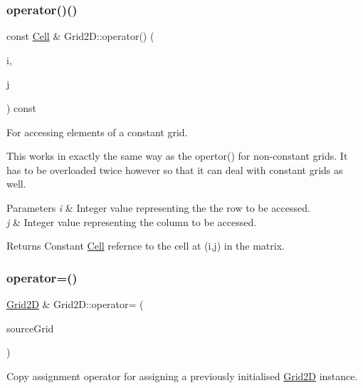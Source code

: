 \subsubsection{\texorpdfstring{operator()()}{operator()()}\hspace{0.1cm}{\footnotesize\ttfamily [2/2]}}
{\footnotesize\ttfamily const \hyperlink{class_cell}{Cell} \& Grid2\+D\+::operator() (\begin{DoxyParamCaption}\item[{int}]{i,  }\item[{int}]{j }\end{DoxyParamCaption}) const}



For accessing elements of a constant grid. 

This works in exactly the same way as the opertor() for non-\/constant grids. It has to be overloaded twice however so that it can deal with constant grids as well.


\begin{DoxyParams}{Parameters}
{\em i} & Integer value representing the the row to be accessed.\\
\hline
{\em j} & Integer value representing the column to be accessed.\\
\hline
\end{DoxyParams}
\begin{DoxyReturn}{Returns}
Constant \hyperlink{class_cell}{Cell} refernce to the cell at (i,j) in the matrix. 
\end{DoxyReturn}
\mbox{\label{class_grid2_d_adff3f6e81d650b093fa6c130c7619a07}} 
\subsubsection{\texorpdfstring{operator=()}{operator=()}\hspace{0.1cm}{\footnotesize\ttfamily [1/2]}}
{\footnotesize\ttfamily \hyperlink{class_grid2_d}{Grid2D} \& Grid2\+D\+::operator= (\begin{DoxyParamCaption}\item[{const \hyperlink{class_grid2_d}{Grid2D} \&}]{source\+Grid }\end{DoxyParamCaption})}



Copy assignment operator for assigning a previously initialised \hyperlink{class_grid2_d}{Grid2D} instance. 

